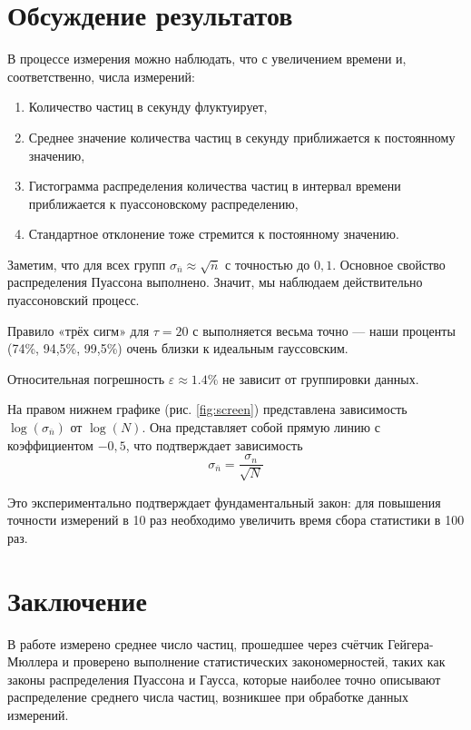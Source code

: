 \documentclass[a4paper, 12pt]{article}
\begin{document}
\section{Обсуждение результатов}

В процессе измерения можно наблюдать, что с увеличением времени
и, соответственно, числа измерений:
\begin{enumerate}
	\item Количество частиц в секунду флуктуирует,
	\item Среднее значение количества частиц в секунду
	приближается к постоянному значению, 
	\item Гистограмма распределения количества частиц в интервал 
	времени приближается к пуассоновскому распределению, 
	\item Стандартное отклонение тоже стремится к постоянному значению.
\end{enumerate}

Заметим, что для всех групп
$\sigma_{\overline{n}} \approx \sqrt{\overline{n}}$
с точностью до $0{,}1$.
Основное свойство распределения Пуассона выполнено.
Значит, мы наблюдаем действительно пуассоновский процесс.

Правило «трёх сигм» для $\tau=20$ с выполняется весьма точно
— наши проценты (74\%, 94{,}5\%, 99{,}5\%) очень близки к идеальным гауссовским.

Относительная погрешность $\varepsilon \approx 1.4\%$ не зависит от группировки данных.

На правом нижнем графике (рис. \ref{fig:screen})
представлена зависимость $\log(\sigma_{\overline{n}})$ от $\log(N)$.
Она представляет собой прямую линию с коэффициентом $-0{,}5$,
что подтверждает зависимость %
$$\sigma_{\overline{n}} = \frac{\sigma_n}{\sqrt{N}}$$

Это экспериментально подтверждает фундаментальный закон:
для повышения точности измерений в 10 раз
необходимо увеличить время сбора статистики в 100 раз.

\section{Заключение}

В работе измерено среднее число частиц, прошедшее через счётчик Гейгера-Мюллера
и проверено выполнение статистических закономерностей, таких как законы
распределения Пуассона и Гаусса, которые наиболее точно описывают распределение
среднего числа частиц, возникшее при обработке данных измерений.
\end{document}

